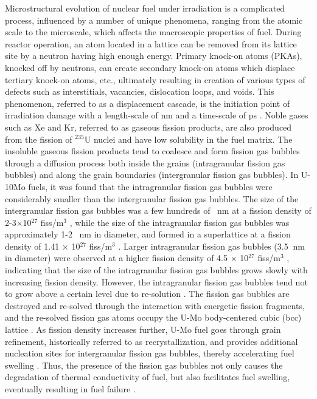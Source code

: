 \documentclass[preprint,12pt]{elsarticle}
\begin{document}
\indent Microstructural evolution of nuclear fuel under irradiation is a complicated process, influenced by a number of unique phenomena, ranging from the atomic scale to the microscale, which affects the macroscopic properties of fuel. During reactor operation, an atom located in a lattice can be removed from its lattice site by a neutron having high enough energy. Primary knock-on atoms (PKAs), knocked off by neutrons, can create secondary knock-on atoms which displace tertiary knock-on atoms, etc., ultimately resulting in creation of various types of defects such as interstitials, vacancies, dislocation loops, and voids. This phenomenon, referred to as a displacement cascade, is the initiation point of irradiation damage with a length-scale of nm and a time-scale of ps \cite{nordlund2018primary}. Noble gases such as Xe and Kr, referred to as gaseous fission products, are also produced from the fission of $^{235}$U nuclei and have low solubility in the fuel matrix. The insoluble gaseous fission products tend to coalesce and form fission gas bubbles through a diffusion process both inside the grains (intragranular fission gas bubbles) and along the grain boundaries (intergranular fission gas bubbles). In U-10Mo fuels, it was found that the intragranular fission gas bubbles were considerably smaller than the intergranular fission gas bubbles. The size of the intergranular fission gas bubbles was a few hundreds of \SI{}{\nano\metre} at a fission density of 2-3$\times$10$^{27}$ fiss/m$^{3}$ \cite{kim2011fission, kim2008characterization}, while the size of the intragranular fission gas bubbles was approximately 1-2 \SI{}{\nano\metre} in diameter, and formed in a superlattice at a fission density of 1.41 $\times$ 10$^{27}$ fiss/m$^{3}$ \cite{van2008transmission}. Larger intragranular fission gas bubbles (3.5 $\SI{}{\nano\metre}$ in diameter) were observed at a higher fission density of 4.5 $\times$ 10$^{27}$ fiss/m$^{3}$ \cite{gan2010transmission}, indicating that the size of the intragranular fission gas bubbles grows slowly with increasing fission density. However, the intragranular fission gas bubbles tend not to grow above a certain level due to re-solution \cite{olander2006re}. The fission gas bubbles are destroyed and re-solved through the interaction with energetic fission fragments, and the re-solved fission gas atoms occupy the U-Mo body-centered cubic (bcc) lattice \cite{olander2006re}. As fission density increases further, U-Mo fuel goes through grain refinement, historically referred to as recrystallization, and provides additional nucleation sites for intergranular fission gas bubbles, thereby accelerating fuel swelling \cite{rest2005model, kim2013recrystallization, liang2016mesoscale}. Thus, the presence of the fission gas bubbles not only causes the degradation of thermal conductivity of fuel, but also facilitates fuel swelling, eventually resulting in fuel failure \cite{hu2015assessment, huber2018thermal}.\\
\end{document}
